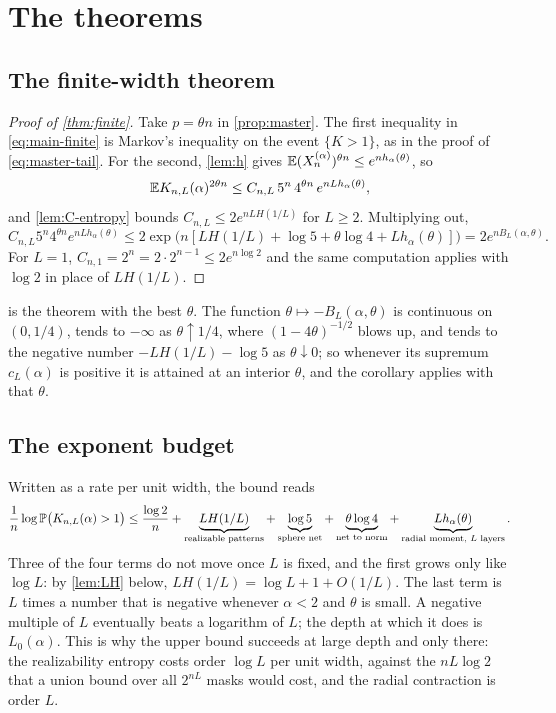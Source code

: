 \section{The theorems}
\label{sec:theorems}

\subsection{The finite-width theorem}

\begin{proof}[Proof of \cref{thm:finite}]
Take $p=\theta n$ in \cref{prop:master}. The first inequality in \cref{eq:main-finite} is Markov's inequality on the event $\{K>1\}$, as in the proof of \cref{eq:master-tail}. For the second, \cref{lem:h} gives $\mathbb{E}(X_n^{(\alpha)})^{\theta n}\le e^{nh_\alpha(\theta)}$, so
\[
\mathbb{E} K_{n,L}(\alpha)^{2\theta n}\le C_{n,L}\,5^n\,4^{\theta n}\,e^{nLh_\alpha(\theta)},
\]
and \cref{lem:C-entropy} bounds $C_{n,L}\le 2e^{nLH(1/L)}$ for $L\ge2$. Multiplying out,
\[
C_{n,L}5^n4^{\theta n}e^{nLh_\alpha(\theta)}\le 2\exp\bigl(n[LH(1/L)+\log5+\theta\log4+Lh_\alpha(\theta)]\bigr)=2e^{nB_L(\alpha,\theta)}.
\]
For $L=1$, $C_{n,1}=2^n=2\cdot2^{n-1}\le2e^{n\log2}$ and the same computation applies with $\log2$ in place of $LH(1/L)$.
\end{proof}

 is the theorem with the best $\theta$. The function $\theta\mapsto-B_L(\alpha,\theta)$ is continuous on $(0,1/4)$, tends to $-\infty$ as $\theta\uparrow1/4$, where $(1-4\theta)^{-1/2}$ blows up, and tends to the negative number $-LH(1/L)-\log5$ as $\theta\downarrow0$; so whenever its supremum $c_L(\alpha)$ is positive it is attained at an interior $\theta$, and the corollary applies with that $\theta$.

\subsection{The exponent budget}
\label{sec:budget}

Written as a rate per unit width, the bound reads
\[
\frac1n\log\mathbb{P}\bigl(K_{n,L}(\alpha)>1\bigr)\le\frac{\log2}n+
\underbrace{LH(1/L)}_{\text{realizable patterns}}+\underbrace{\log5}_{\text{sphere net}}+\underbrace{\theta\log4}_{\text{net to norm}}+\underbrace{Lh_\alpha(\theta)}_{\text{radial moment, $L$ layers}} .
\]
Three of the four terms do not move once $L$ is fixed, and the first grows only like $\log L$: by \cref{lem:LH} below, $LH(1/L)=\log L+1+O(1/L)$. The last term is $L$ times a number that is negative whenever $\alpha<2$ and $\theta$ is small. A negative multiple of $L$ eventually beats a logarithm of $L$; the depth at which it does is $L_0(\alpha)$. This is why the upper bound succeeds at large depth and only there: the realizability entropy costs order $\log L$ per unit width, against the $nL\log2$ that a union bound over all $2^{nL}$ masks would cost, and the radial contraction is order $L$.

